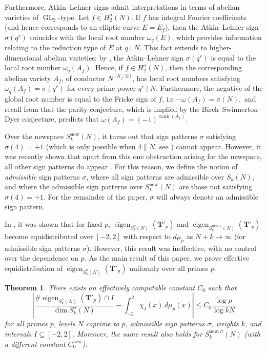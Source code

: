 \documentclass[11pt,letterpaper,reqno]{amsart}
\newtheorem{theorem}{Theorem}[section]
\theoremstyle{definition}
\numberwithin{equation}{section}
\numberwithin{figure}{section}
\numberwithin{table}{section}
\newcommand{\nw}{\mathrm{new}}
\begin{document}
Furthermore, Atkin--Lehner signs admit interpretations in terms of abelian varieties of $\operatorname{GL}_2$-type. Let $f \in H_2^{\sigma}(N)$. If $f$ has integral Fourier coefficients (and hence corresponds to an elliptic curve $E = E_f$), then the Atkin--Lehner sign $\sigma(q^r)$ coincides with the local root number $\omega_q(E)$, which provides information relating to the reduction type of $E$ at $q\mid N$. This fact extends to higher-dimensional abelian varieties: by \cite{schmidt2002remarks,Car86}, the Atkin--Lehner sign $\sigma(q^r)$ is equal to the local root number $\omega_q(A_f)$. Hence, if $f \in H_2^{\sigma}(N)$, then the corresponding abelian variety $A_f$, of conductor $N^{[K_f:\mathbb{Q}]}$, has local root numbers satisfying $\omega_q(A_f)=\sigma(q^r)$ for every prime power $q^r \mid N$. Furthermore, the negative of the global root number is equal to the Fricke sign of $f$, i.e $-\omega(A_f)=\sigma(N),$ and recall from \cite{Rohrlich1996OnThe} that the parity conjecture, which is implied by the Birch--Swinnerton-Dyer conjecture, predicts that
$\omega(A_f)=(-1)^{\operatorname{rank}(A_f)}.$

Over the newspace $S_k^\nw(N)$, it turns out that sign patterns $\sigma$ satisfying $\sigma(4)=+1$ (which is only possible when $4 \| N$, see \cite[Theorem 7]{AtkinLehner1970Hecke}) cannot appear. However, it was recently shown that apart from this one obstruction arising for the newspace, all other sign patterns do appear \cite[Theorem 1.1]{RVWX26}. For this reason, we define the notion of \textit{admissible} sign patterns $\sigma$, where all sign patterns are admissible over $S_k(N)$, and where the admissible sign patterns over $S_k^\nw(N)$ are those not satisfying $\sigma(4)=+1$. For the remainder of the paper, $\sigma$ will always denote an admissible sign pattern.

In \cite[Theorem 1.3]{RVWX26}, it was shown that for fixed $p$, $\operatorname{eigen}_{S_k^\sigma(N)}(\mathbf{T}'_p)$ and $\operatorname{eigen}_{S_k^{\nw,\sigma}(N)}(\mathbf{T}'_p)$ become equidistributed over $[-2,2]$ with respect to $d\mu_p$ as $N+k\to\infty$ (for admissible sign patterns $\sigma$). However, this result was ineffective, with no control over the dependence on $p$.
As the main result of this paper, we prove effective equidistribution of $\operatorname{eigen}_{S_k^\sigma(N)}(\mathbf{T}'_p)$ uniformly over all primes $p$.
\begin{theorem} \label{thm:main-theorem}
    There exists an effectively computable constant $C_0$ such that 
    $$
    \left| \frac{\# \operatorname{eigen}_{S_k^{\sigma}(N)}(\mathbf{T}'_p) \cap I}{\dim S_k^{\sigma}(N)} - \int_{-2}^2 \chi_I(x) \, d \mu_p(x)  \right| \le C_0  \frac{\log p}{\log kN}
    $$
    for all primes $p$, levels $N$ coprime to $p$, admissible sign patterns $\sigma$, weights $k$, and intervals $I \subseteq [-2,2]$. Moreover, the same result also holds for $S_k^{\nw,\sigma}(N)$ (with a different constant $C_0^\nw$).
\end{theorem}
\end{document}
